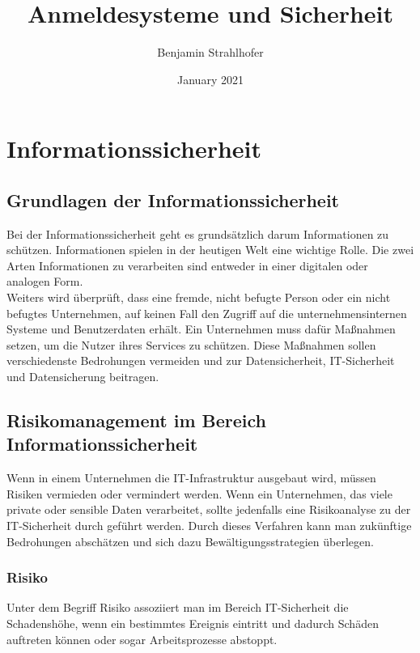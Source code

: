 \documentclass[12pt, oneside]{article}
\title{Anmeldesysteme und Sicherheit}
\author{Benjamin Strahlhofer}
\date{January 2021}
\begin{document}
\begin{titlepage}
\maketitle
\end{titlepage}

\tableofcontents

\newpage

\section{Informationssicherheit}

\subsection{Grundlagen der Informationssicherheit}
Bei der Informationssicherheit geht es grundsätzlich darum Informationen zu schützen. Informationen spielen in der heutigen Welt eine wichtige Rolle. Die zwei Arten Informationen zu verarbeiten sind entweder in einer digitalen oder analogen Form. 
\\
Weiters wird überprüft, dass eine fremde, nicht befugte Person oder ein nicht befugtes Unternehmen, auf keinen Fall den Zugriff auf die unternehmensinternen Systeme und Benutzerdaten erhält. Ein Unternehmen muss dafür Maßnahmen setzen, um die Nutzer ihres Services zu schützen. Diese Maßnahmen sollen verschiedenste Bedrohungen vermeiden und zur Datensicherheit, IT-Sicherheit und Datensicherung beitragen.
\\


\subsection{Risikomanagement im Bereich Informationssicherheit}
Wenn in einem Unternehmen die IT-Infrastruktur ausgebaut wird, müssen Risiken vermieden oder vermindert werden. Wenn ein Unternehmen, das viele private oder sensible Daten verarbeitet, sollte jedenfalls eine Risikoanalyse zu der IT-Sicherheit durch geführt werden. Durch dieses Verfahren kann man zukünftige Bedrohungen abschätzen und sich dazu Bewältigungsstrategien überlegen.

\subsubsection{Risiko}
Unter dem Begriff Risiko assoziiert man im Bereich IT-Sicherheit die Schadenshöhe, wenn ein bestimmtes Ereignis eintritt und dadurch Schäden auftreten können oder sogar Arbeitsprozesse abstoppt.
\end{document}
